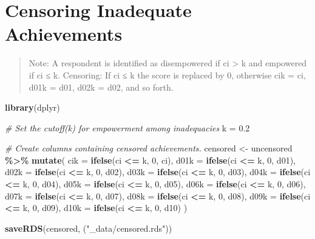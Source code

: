 \documentclass[
]{book}
\newenvironment{Shaded}{\begin{snugshade}}{\end{snugshade}}
\newcommand{\CommentTok}[1]{\textcolor[rgb]{0.56,0.35,0.01}{\textit{#1}}}
\newcommand{\DataTypeTok}[1]{\textcolor[rgb]{0.13,0.29,0.53}{#1}}
\newcommand{\DecValTok}[1]{\textcolor[rgb]{0.00,0.00,0.81}{#1}}
\newcommand{\FloatTok}[1]{\textcolor[rgb]{0.00,0.00,0.81}{#1}}
\newcommand{\KeywordTok}[1]{\textcolor[rgb]{0.13,0.29,0.53}{\textbf{#1}}}
\newcommand{\NormalTok}[1]{#1}
\newcommand{\OperatorTok}[1]{\textcolor[rgb]{0.81,0.36,0.00}{\textbf{#1}}}
\newcommand{\StringTok}[1]{\textcolor[rgb]{0.31,0.60,0.02}{#1}}
\begin{document}
\hypertarget{censoring-inadequate-achievements}{%
\section{Censoring Inadequate Achievements}\label{censoring-inadequate-achievements}}

\begin{quote}
Note: A respondent is identified as disempowered if ci \textgreater{} k and empowered if ci ≤ k.
Censoring: If ci ≤ k the score is replaced by 0, otherwise cik = ci, d01k = d01, d02k = d02, and so forth.
\end{quote}

\begin{Shaded}
\begin{Highlighting}[]
\KeywordTok{library}\NormalTok{(dplyr)}

\CommentTok{\# Set the cutoff(k) for empowerment among inadequacies}
\NormalTok{k =}\StringTok{ }\FloatTok{0.2}

\CommentTok{\# Create columns containing censored achievements.}
\NormalTok{censored \textless{}{-}}\StringTok{ }\NormalTok{uncensored }\OperatorTok{\%\textgreater{}\%}\StringTok{ }
\StringTok{  }\KeywordTok{mutate}\NormalTok{(}
    \DataTypeTok{cik =} \KeywordTok{ifelse}\NormalTok{(ci }\OperatorTok{\textless{}=}\StringTok{ }\NormalTok{k, }\DecValTok{0}\NormalTok{, ci),}
    \DataTypeTok{d01k =} \KeywordTok{ifelse}\NormalTok{(ci }\OperatorTok{\textless{}=}\StringTok{ }\NormalTok{k, }\DecValTok{0}\NormalTok{, d01), }
    \DataTypeTok{d02k =} \KeywordTok{ifelse}\NormalTok{(ci }\OperatorTok{\textless{}=}\StringTok{ }\NormalTok{k, }\DecValTok{0}\NormalTok{, d02), }
    \DataTypeTok{d03k =} \KeywordTok{ifelse}\NormalTok{(ci }\OperatorTok{\textless{}=}\StringTok{ }\NormalTok{k, }\DecValTok{0}\NormalTok{, d03), }
    \DataTypeTok{d04k =} \KeywordTok{ifelse}\NormalTok{(ci }\OperatorTok{\textless{}=}\StringTok{ }\NormalTok{k, }\DecValTok{0}\NormalTok{, d04),}
    \DataTypeTok{d05k =} \KeywordTok{ifelse}\NormalTok{(ci }\OperatorTok{\textless{}=}\StringTok{ }\NormalTok{k, }\DecValTok{0}\NormalTok{, d05),}
    \DataTypeTok{d06k =} \KeywordTok{ifelse}\NormalTok{(ci }\OperatorTok{\textless{}=}\StringTok{ }\NormalTok{k, }\DecValTok{0}\NormalTok{, d06),}
    \DataTypeTok{d07k =} \KeywordTok{ifelse}\NormalTok{(ci }\OperatorTok{\textless{}=}\StringTok{ }\NormalTok{k, }\DecValTok{0}\NormalTok{, d07),}
    \DataTypeTok{d08k =} \KeywordTok{ifelse}\NormalTok{(ci }\OperatorTok{\textless{}=}\StringTok{ }\NormalTok{k, }\DecValTok{0}\NormalTok{, d08),}
    \DataTypeTok{d09k =} \KeywordTok{ifelse}\NormalTok{(ci }\OperatorTok{\textless{}=}\StringTok{ }\NormalTok{k, }\DecValTok{0}\NormalTok{, d09),}
    \DataTypeTok{d10k =} \KeywordTok{ifelse}\NormalTok{(ci }\OperatorTok{\textless{}=}\StringTok{ }\NormalTok{k, }\DecValTok{0}\NormalTok{, d10)}
\NormalTok{    )}

\KeywordTok{saveRDS}\NormalTok{(censored, (}\StringTok{"\_data/censored.rds"}\NormalTok{))}
\end{Highlighting}
\end{Shaded}
\end{document}
